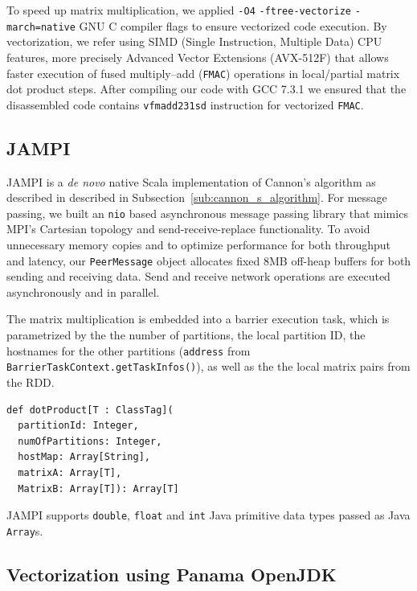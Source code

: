\documentclass[fleqn,10pt]{SelfArx} %
\begin{document}
To speed up matrix multiplication, we applied \texttt{-O4} \texttt{-ftree-vectorize} \texttt{-march=native} GNU C compiler flags to ensure vectorized code execution. By vectorization, we refer using SIMD (Single Instruction, Multiple Data) CPU features, more precisely Advanced Vector Extensions (AVX-512F) that allows faster execution of fused multiply–add (\texttt{{FMAC}}) operations in local/partial matrix dot product steps. After compiling our code with GCC 7.3.1 we ensured that the disassembled code contains \texttt{vfmadd231sd} instruction for vectorized \texttt{FMAC}. 


\subsection{JAMPI} %
\label{sub:jampi_implementation}

JAMPI is a \emph{de novo} native Scala implementation of Cannon's algorithm as described in described in Subsection~\ref{sub:cannon_s_algorithm}. For message passing, we built an \texttt{nio} based asynchronous message passing library that mimics MPI's Cartesian topology and send-receive-replace functionality. To avoid unnecessary memory copies and to optimize performance for both throughput and latency, our \texttt{PeerMessage} object allocates fixed 8MB off-heap buffers for both sending and receiving data. Send and receive network operations are executed asynchronously and in parallel.

The matrix multiplication is embedded into a barrier execution task, which is parametrized by the the number of partitions, the local partition ID, the hostnames for the other partitions (\texttt{address} from \texttt{BarrierTaskContext.getTaskInfos()}), as well as the  the local matrix pairs from the RDD.

\begin{lstlisting}
def dotProduct[T : ClassTag](
  partitionId: Integer,
  numOfPartitions: Integer,
  hostMap: Array[String],
  matrixA: Array[T],
  MatrixB: Array[T]): Array[T] 
\end{lstlisting}

JAMPI supports \texttt{double}, \texttt{float} and \texttt{int} Java primitive data types passed as Java \texttt{Array}s.


\subsection{Vectorization using Panama OpenJDK} %
\label{sub:vector_panama}
\end{document}
